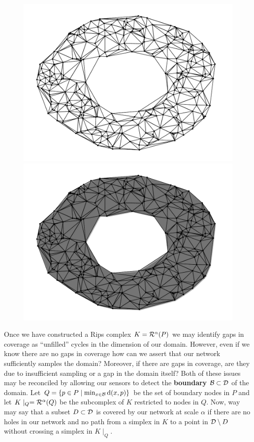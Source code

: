 \begin{figure}[htbp]
\centering
    \includegraphics[scale=0.5]{figures/boundary_graph.pdf}
    \includegraphics[scale=0.5]{figures/boundary_complex.pdf}
     \caption{}
     \label{fig:boundary1}
 \end{figure}

Once we have constructed a Rips complex $K = \mathcal{R}^\alpha(P)$ we may identify gaps in coverage as ``unfilled'' cycles in the dimension of our domain.
However, even if we know there are no gaps in coverage how can we assert that our network sufficiently samples the domain?
Moreover, if there are gaps in coverage, are they due to insufficient sampling or a gap in the domain itself?
Both of these issues may be reconciled by allowing our sensors to detect the \textbf{boundary} ${\mathcal{B}}\subset{\mathcal{D}}$ of the domain.
Let $Q = \{p\in P\mid \min_{x\in{\mathcal{B}}}\mathrm{d}(x, p)\}$ be the set of boundary nodes in $P$ and let $K\mid_Q = \mathcal{R}^\alpha(Q)$ be the subcomplex of $K$ restricted to nodes in $Q$.
Now, way may say that a subset $D\subset{\mathcal{D}}$ is covered by our network at scale $\alpha$ if there are no holes in our network and no path from a simplex in $K$ to a point in ${\mathcal{D}}\setminus D$ without crossing a simplex in $K\mid_Q$.

